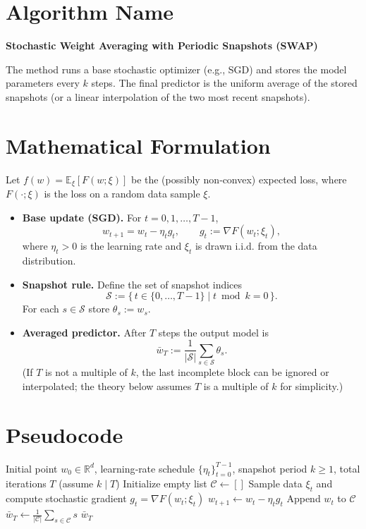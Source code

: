 \documentclass{article}
\begin{document}
\section*{Algorithm Name}
\textbf{Stochastic Weight Averaging with Periodic Snapshots (SWAP)}  

The method runs a base stochastic optimizer (e.g., SGD) and stores the model parameters every $k$ steps.  
The final predictor is the uniform average of the stored snapshots (or a linear interpolation of the two most recent snapshots).  

\section*{Mathematical Formulation}
Let $f(w)=\mathbb{E}_{\xi}[F(w;\xi)]$ be the (possibly non‑convex) expected loss, where $F(\cdot;\xi)$ is the loss on a random data sample $\xi$.  
\begin{itemize}[leftmargin=*]
    \item \textbf{Base update (SGD).} For $t=0,1,\dots,T-1$,
    \begin{equation}
        w_{t+1}=w_t-\eta_t g_t,\qquad 
        g_t:=\nabla F(w_t;\xi_t),
    \end{equation}
    where $\eta_t>0$ is the learning rate and $\xi_t$ is drawn i.i.d. from the data distribution.
    \item \textbf{Snapshot rule.} Define the set of snapshot indices
    \[
        \mathcal{S}:=\{\,t\in\{0,\dots,T-1\}\mid t\bmod k =0\,\}.
    \]
    For each $s\in\mathcal{S}$ store $\theta_s:=w_s$.
    \item \textbf{Averaged predictor.} After $T$ steps the output model is
    \begin{equation}
        \bar w_T:=\frac{1}{|\mathcal{S}|}\sum_{s\in\mathcal{S}}\theta_s .
    \end{equation}
    (If $T$ is not a multiple of $k$, the last incomplete block can be ignored or interpolated; the theory below assumes $T$ is a multiple of $k$ for simplicity.)
\end{itemize}

\section*{Pseudocode}
\begin{algorithm}[H]
\caption{SWAP (Stochastic Weight Averaging with Periodic Snapshots)}
\begin{algorithmic}[1]
\Require Initial point $w_0\in\mathbb{R}^d$, learning‑rate schedule $\{\eta_t\}_{t=0}^{T-1}$, snapshot period $k\ge 1$, total iterations $T$ (assume $k\mid T$)
\State Initialize empty list $\mathcal{C}\gets []$
    \State Sample data $\xi_t$ and compute stochastic gradient $g_t=\nabla F(w_t;\xi_t)$
    \State $w_{t+1}\gets w_t-\eta_t g_t$ 
        \State Append $w_t$ to $\mathcal{C}$ 
    \EndIf
\EndFor
\State $\bar w_T \gets \frac{1}{|\mathcal{C}|}\sum_{s\in\mathcal{C}} s$ 
\State \Return $\bar w_T$
\end{algorithmic}
\end{algorithm}
\end{document}
